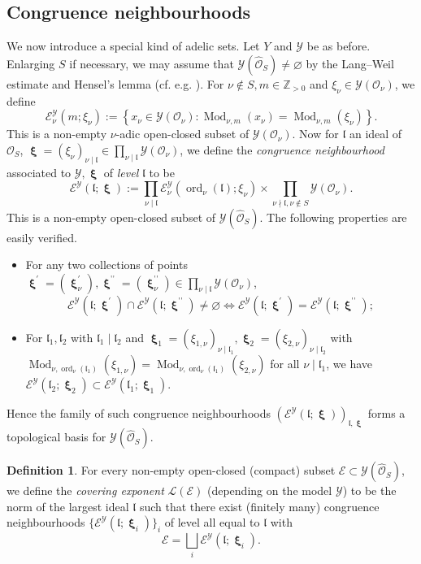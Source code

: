 \documentclass[11pt,letterpaper]{amsart}
\newcommand{\BZ}{{\mathbb {Z}}}
\newcommand{\CE}{{\mathcal {E}}}
\newcommand{\CL}{{\mathcal {L}}}
\newcommand{\CO}{{\mathcal {O}}}
\newcommand{\CY}{{\mathcal {Y}}}
\DeclareMathOperator*{\dprime}{\prime \prime}
\DeclareMathOperator{\bxi}{\mathbf{\xi}}
\theoremstyle{plain}
\numberwithin{equation}{section}
\theoremstyle{definition}
\newtheorem{definition}[theorem]{Definition}
\theoremstyle{remark}
\begin{document}
\subsection{Congruence neighbourhoods}\label{se:congneigh}
We now introduce a special kind of adelic sets. Let $Y$ and $\CY$ be as before. Enlarging $S$ if necessary, we may assume that $\CY(\widehat{\CO}_S)\neq\varnothing$ by the Lang--Weil estimate \cite{Lang-Weil} and Hensel's lemma (cf. e.g. \cite[\S1.7]{Cao-Huang2}). For $\nu\notin S,m\in\BZ_{>0}$ and  $\xi_\nu\in \CY(\CO_\nu)$, we define 
$$\CE_\nu^{\CY}(m;\xi_\nu):=\left\{x_\nu\in\CY(\CO_\nu):\operatorname{Mod}_{\nu,m}(x_\nu)=\operatorname{Mod}_{\nu,m}(\xi_\nu)\right\}.$$ This is a non-empty $\nu$-adic open-closed subset of $\CY(\CO_\nu)$. 
Now for $\mathfrak{l}$ an ideal of $\CO_S$, $\bxi=(\xi_\nu)_{\nu\mid \mathfrak{l}}\in\prod_{\nu\mid \mathfrak{l}}\CY(\CO_\nu)$, we define the \emph{congruence neighbourhood} associated to $\CY,\bxi$ of \emph{level} $\mathfrak{l}$ to be
$$\CE^{\CY}(\mathfrak{l};\bxi):=\prod_{\nu\mid \mathfrak{l}}\CE^{\CY}_\nu(\operatorname{ord}_{\nu}(\mathfrak{l});\xi_\nu)\times \prod_{\nu\nmid \mathfrak{l},\nu\notin S}\CY(\CO_\nu).$$
This is a non-empty open-closed subset of $\CY(\widehat{\CO}_S)$.  The following properties are easily verified. 
\begin{itemize}
	\item For any two collections of points $\bxi^\prime=(\bxi_\nu^\prime),\bxi^{\dprime}=(\bxi^{\dprime}_\nu)\in \prod_{\nu\mid \mathfrak{l}}\CY(\CO_\nu)$,
	\begin{equation}\label{eq:disjoint}
		\CE^{\CY}(\mathfrak{l};\bxi^\prime)\cap \CE^{\CY}(\mathfrak{l};\bxi^{\dprime})\neq\varnothing\Longleftrightarrow \CE^{\CY}(\mathfrak{l};\bxi^\prime)= \CE^{\CY}(\mathfrak{l};\bxi^{\dprime});
	\end{equation}
\item For $\mathfrak{l}_1,\mathfrak{l}_2$ with $\mathfrak{l}_1\mid \mathfrak{l}_2$ and $\bxi_1=(\xi_{1,\nu})_{\nu\mid\mathfrak{l}_1},\bxi_2=(\xi_{2,\nu})_{\nu\mid\mathfrak{l}_2}$ with $\operatorname{Mod}_{\nu,\operatorname{ord}_{\nu}(\mathfrak{l}_1)}(\xi_{1,\nu})=\operatorname{Mod}_{\nu,\operatorname{ord}_{\nu}(\mathfrak{l}_1)}(\xi_{2,\nu})$ for all $\nu\mid \mathfrak{l}_1$, we have
$\CE^{\CY}(\mathfrak{l}_2;\bxi_2)\subset \CE^{\CY}(\mathfrak{l}_1;\bxi_1)$. 
\end{itemize}
Hence the family of such congruence neighbourhoods $(\CE^{\CY}(\mathfrak{l};\bxi))_{\mathfrak{l},\bxi}$ forms a topological basis for $\CY(\widehat{\CO}_S)$. 
\begin{definition}\label{def:LCEf}
	For every non-empty open-closed (compact) subset $\CE\subset \CY(\widehat{\CO}_S)$, we define the \emph{covering exponent} $\CL(\CE)$ (depending on the model $\CY$) to be the norm of the largest ideal $\mathfrak{l}$ such that there exist (finitely many)  congruence neighbourhoods $\{\CE^\CY(\mathfrak{l};\bxi_i)\}_i$ of level all equal to $\mathfrak{l}$ with $$\CE=\bigsqcup_{i} \CE^\CY(\mathfrak{l};\bxi_i).$$
\end{definition}
\end{document}
